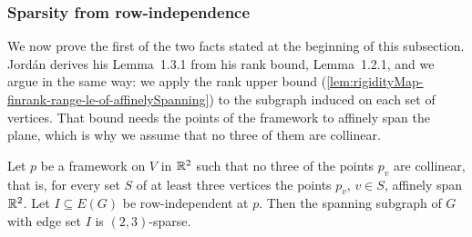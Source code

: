 \subsubsection{Sparsity from row-independence}

We now prove the first of the two facts stated at the beginning of
this subsection. Jord\'an derives his Lemma~1.3.1 from his rank bound,
Lemma~1.2.1, and we argue in the same way: we apply the rank upper
bound (\cref{lem:rigidityMap-finrank-range-le-of-affinelySpanning}) to
the subgraph induced on each set of vertices. That bound needs the
points of the framework to affinely span the plane, which is why we
assume that no three of them are collinear.

\begin{lemma}
  \label{lem:isSparse-of-rowIndependent-two}
  \leanok
  Let $p$ be a framework on $V$ in ${\mathbb{R}}^{2}$ such that no three of the
  points $p_v$ are collinear, that is, for every set $S$ of at least
  three vertices the points $p_v$, $v \in S$, affinely span ${\mathbb{R}}^{2}$.
  Let $I \subseteq E(G)$ be row-independent at $p$. Then the spanning
  subgraph of $G$ with edge set $I$ is $(2, 3)$-sparse.
\end{lemma}
